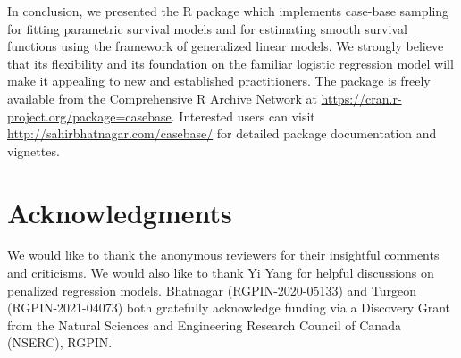 In conclusion, we presented the R package  which
implements case-base sampling for fitting parametric survival models and
for estimating smooth survival functions using the framework of
generalized linear models. We strongly believe that its flexibility and
its foundation on the familiar logistic regression model will make it
appealing to new and established practitioners. The 
package is freely available from the Comprehensive R Archive Network at
\url{https://cran.r-project.org/package=casebase}. Interested users can
visit \url{http://sahirbhatnagar.com/casebase/} for detailed package
documentation and vignettes.

\hypertarget{acknowledgments}{%
\section{Acknowledgments}\label{acknowledgments}}

We would like to thank the anonymous reviewers for their insightful
comments and criticisms. We would also like to thank Yi Yang for helpful
discussions on penalized regression models. \mbox{Bhatnagar}
(RGPIN-2020-05133) and \mbox{Turgeon} (RGPIN-2021-04073) both gratefully
acknowledge funding via a Discovery Grant from the Natural Sciences and
Engineering Research Council of Canada (NSERC), RGPIN.



\address{%
Sahir Rai Bhatnagar*\\
McGill University\\%
1020 Pine Avenue West Montreal, QC, Canada H3A 1A2\\
%
\url{http://sahirbhatnagar.com/}\\%
%
%
}

\address{%
Maxime Turgeon*\\
University of Manitoba\\%
186 Dysart Road Winnipeg, MB, Canada R3T 2N2\\
%
\url{https://maxturgeon.ca/}\\%
%
%
}

\address{%
Jesse Islam\\
McGill University\\%
1020 Pine Avenue West Montreal, QC, Canada H3A 1A2\\
%
%
%
%
}

\address{%
James A. Hanley\\
McGill University\\%
1020 Pine Avenue West Montreal, QC, Canada H3A 1A2\\
%
\url{http://www.medicine.mcgill.ca/epidemiology/hanley/}\\%
%
%
}

\address{%
Olli Saarela\\
University of Toronto\\%
Dalla Lana School of Public Health, 155 College Street, 6th floor,
Toronto, Ontario M5T 3M7, Canada\\
%
\url{http://individual.utoronto.ca/osaarela/}\\%
%
%
}
